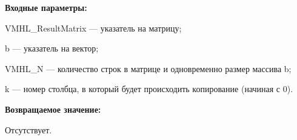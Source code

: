 \textbf{Входные параметры:}  
 
VMHL\_ResultMatrix --- указатель на матрицу;
 
b --- указатель на вектор;
 
VMHL\_N --- количество строк в матрице и одновременно размер массива b;
 
k --- номер столбца, в который будет происходить копирование (начиная с 0).

\textbf{Возвращаемое значение:}

Отсутствует.